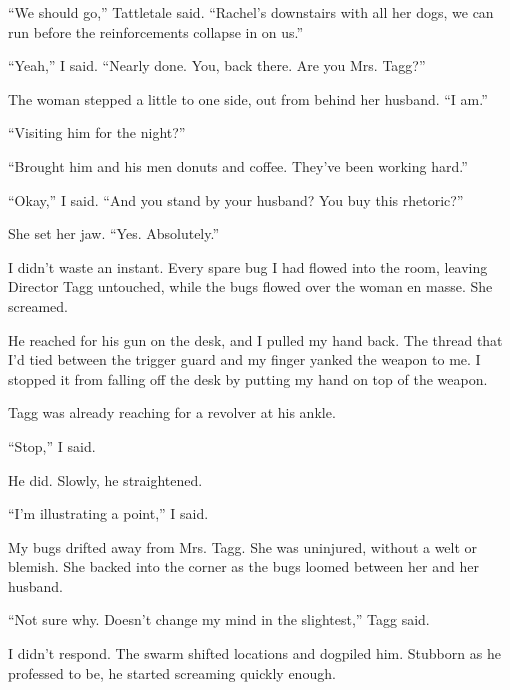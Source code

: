``We should go,'' Tattletale said.  ``Rachel's downstairs with all her dogs, we can run before the reinforcements collapse in on us.''



``Yeah,'' I said.  ``Nearly done.  You, back there.  Are you Mrs. Tagg?''



The woman stepped a little to one side, out from behind her husband.  ``I am.''



``Visiting him for the night?''



``Brought him and his men donuts and coffee.  They've been working hard.''



``Okay,'' I said.  ``And you stand by your husband?  You buy this rhetoric?''



She set her jaw.  ``Yes.  Absolutely.''



I didn't waste an instant.  Every spare bug I had flowed into the room, leaving Director Tagg untouched, while the bugs flowed over the woman en masse.  She screamed.



He reached for his gun on the desk, and I pulled my hand back.  The thread that I'd tied between the trigger guard and my finger yanked the weapon to me.  I stopped it from falling off the desk by putting my hand on top of the weapon.



Tagg was already reaching for a revolver at his ankle.



``Stop,'' I said.



He did.  Slowly, he straightened.



``I'm illustrating a point,'' I said.



My bugs drifted away from Mrs. Tagg.  She was uninjured, without a welt or blemish.  She backed into the corner as the bugs loomed between her and her husband.



``Not sure why.  Doesn't change my mind in the slightest,'' Tagg said.



I didn't respond.  The swarm shifted locations and dogpiled him.  Stubborn as he professed to be, he started screaming quickly enough.



